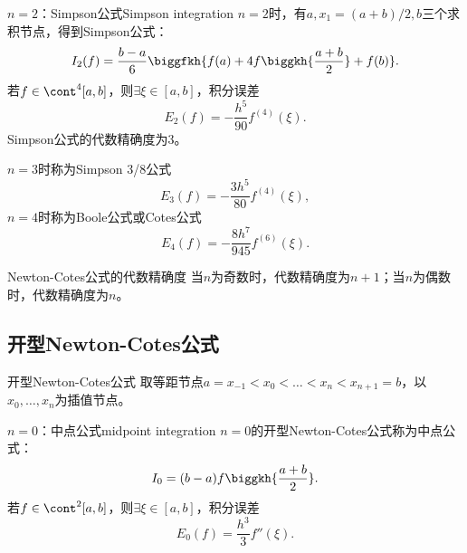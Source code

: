 \begin{example}
    {$n=2$：Simpson公式}{Simpson integration}
    $n=2$时，有$a,x_1=(a+b)/2,b$三个求积节点，得到Simpson公式：
    \begin{equation}
        \label{eqn:Simpson integration}
        I_2(f)=\frac{b-a}6\biggfkh{f(a)+4f\biggkh{\frac{a+b}2}+f(b)}.
    \end{equation}
    若$f\in\cont^4[a,b]$，则$\exists\xi\in[a,b]$，积分误差
    \begin{equation}
        \label{eqn:Simpson error}
        E_2(f)=-\frac{h^5}{90}f^{(4)}(\xi).
    \end{equation}
    Simpson公式的代数精确度为3。
\end{example}

\begin{remark}
    $n=3$时称为Simpson 3/8公式
    \[
        E_3(f)=-\frac{3h^5}{80}f^{(4)}(\xi),
    \]
    $n=4$时称为Boole公式或Cotes公式
    \[
        E_4(f)=-\frac{8h^7}{945}f^{(6)}(\xi).
    \]
\end{remark}

\begin{theorem}
    {Newton-Cotes公式的代数精确度}{}
    当$n$为奇数时，代数精确度为$n+1$；当$n$为偶数时，代数精确度为$n$。
\end{theorem}

\subsection{开型Newton-Cotes公式}

\begin{theorem}
    {开型Newton-Cotes公式}{}
    取等距节点$a=x_{-1}<x_0<\ldots<x_n<x_{n+1}=b$，以$x_0,\ldots,x_n$为插值节点。
\end{theorem}

\begin{example}
    {$n=0$：中点公式}{midpoint integration}
    $n=0$的开型Newton-Cotes公式称为中点公式：
    \begin{equation}
        \label{eqn:midpoint integration}
        I_0=(b-a)f\biggkh{\frac{a+b}2}.
    \end{equation}
    若$f\in\cont^2[a,b]$，则$\exists\xi\in[a,b]$，积分误差
    \begin{equation}
        \label{eqn:midpoint error}
        E_0(f)=\frac{h^3}3f''(\xi).
    \end{equation}
\end{example}

